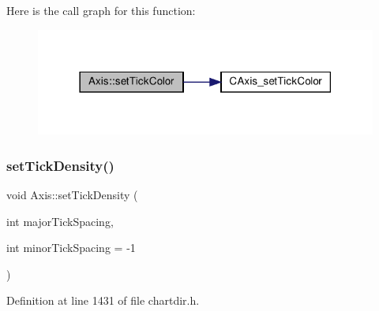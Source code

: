 Here is the call graph for this function\+:
\nopagebreak
\begin{figure}[H]
\begin{center}
\leavevmode
\includegraphics[width=318pt]{class_axis_acc8fbe608da1e15e4a434ef4d1814d18_cgraph}
\end{center}
\end{figure}
\mbox{\label{class_axis_abdb7eae83d8e09c6eb9583a9cabf00d2}} 
\subsubsection{\texorpdfstring{set\+Tick\+Density()}{setTickDensity()}}
{\footnotesize\ttfamily void Axis\+::set\+Tick\+Density (\begin{DoxyParamCaption}\item[{int}]{major\+Tick\+Spacing,  }\item[{int}]{minor\+Tick\+Spacing = {\ttfamily -\/1} }\end{DoxyParamCaption})\hspace{0.3cm}{\ttfamily [inline]}}



Definition at line 1431 of file chartdir.\+h.

